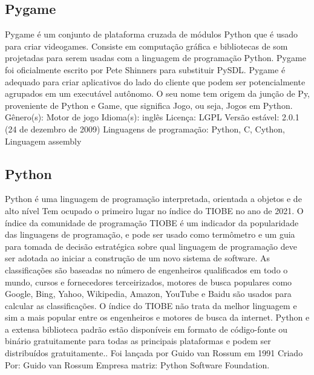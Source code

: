  
%
%
\subsection{Pygame}\label{sec:ANN}

Pygame é um conjunto de plataforma cruzada de módulos Python que é usado para criar videogames.
Consiste em computação gráfica e bibliotecas de som projetadas para serem usadas com a linguagem de programação Python.
Pygame foi oficialmente escrito por Pete Shinners para substituir PySDL.
Pygame é adequado para criar aplicativos do lado do cliente que podem ser potencialmente agrupados em um executável autônomo.
O seu nome tem origem da junção de Py, proveniente de Python e Game, que significa Jogo, ou seja, Jogos em Python.
Gênero(s): Motor de jogo
Idioma(s): inglês
Licença: LGPL
Versão estável: 2.0.1 (24 de dezembro de 2009)
Linguagens de programação: Python, C, Cython, Linguagem assembly\cite{pygame_info_wikipedia}


\subsection{Python}\label{sec:ANN}
Python é uma linguagem de programação interpretada, orientada a objetos e de alto nível Tem ocupado o primeiro lugar no índice do TIOBE no ano de 2021.
O índice da comunidade de programação TIOBE é um indicador da popularidade das linguagens de programação, e pode ser usado como termômetro e um guia para tomada de decisão estratégica sobre qual linguagem de programação deve ser adotada ao iniciar a construção de um novo sistema de software.
As classificações são baseadas no número de engenheiros qualificados em todo o mundo, cursos e fornecedores terceirizados, motores de busca populares como Google, Bing, Yahoo, Wikipedia, Amazon, YouTube e Baidu são usados ​​para calcular as classificações.
O índice do TIOBE não trata da melhor linguagem e sim a mais popular entre os engenheiros e motores de busca da internet.
\cite{tiobe} Python e a extensa biblioteca padrão estão disponíveis em formato de código-fonte ou binário gratuitamente para todas as principais plataformas e podem ser distribuídos gratuitamente.. Foi lançada por Guido van Rossum em 1991
Criado Por: Guido van Rossum
Empresa matriz: Python Software Foundation\cite{python_info_wikipedia}.

